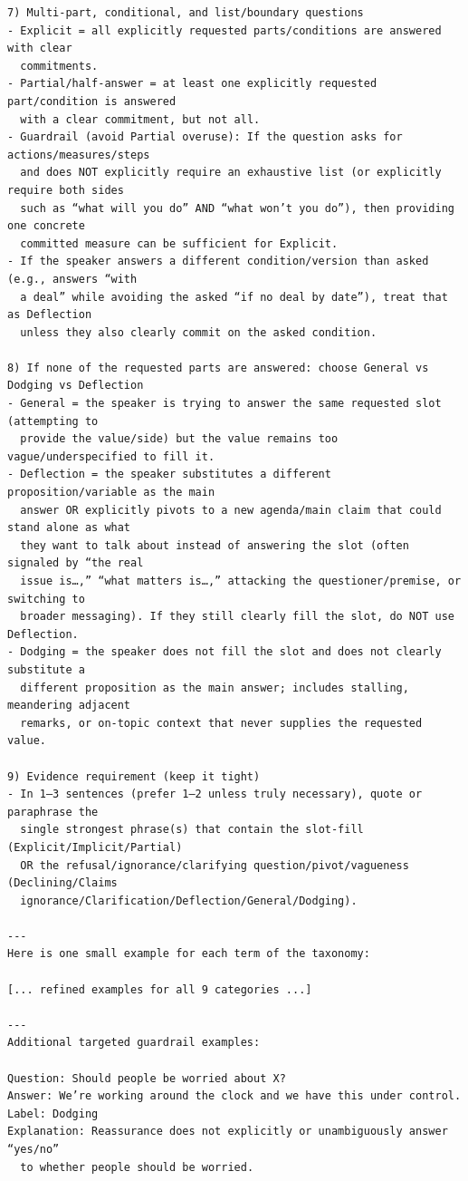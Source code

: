 \documentclass[11pt]{article}
\begin{document}
\begin{lstlisting}[style=yaml]
7) Multi-part, conditional, and list/boundary questions
- Explicit = all explicitly requested parts/conditions are answered with clear
  commitments.
- Partial/half-answer = at least one explicitly requested part/condition is answered
  with a clear commitment, but not all.
- Guardrail (avoid Partial overuse): If the question asks for actions/measures/steps
  and does NOT explicitly require an exhaustive list (or explicitly require both sides
  such as “what will you do” AND “what won’t you do”), then providing one concrete
  committed measure can be sufficient for Explicit.
- If the speaker answers a different condition/version than asked (e.g., answers “with
  a deal” while avoiding the asked “if no deal by date”), treat that as Deflection
  unless they also clearly commit on the asked condition.

8) If none of the requested parts are answered: choose General vs Dodging vs Deflection
- General = the speaker is trying to answer the same requested slot (attempting to
  provide the value/side) but the value remains too vague/underspecified to fill it.
- Deflection = the speaker substitutes a different proposition/variable as the main
  answer OR explicitly pivots to a new agenda/main claim that could stand alone as what
  they want to talk about instead of answering the slot (often signaled by “the real
  issue is…,” “what matters is…,” attacking the questioner/premise, or switching to
  broader messaging). If they still clearly fill the slot, do NOT use Deflection.
- Dodging = the speaker does not fill the slot and does not clearly substitute a
  different proposition as the main answer; includes stalling, meandering adjacent
  remarks, or on-topic context that never supplies the requested value.

9) Evidence requirement (keep it tight)
- In 1–3 sentences (prefer 1–2 unless truly necessary), quote or paraphrase the
  single strongest phrase(s) that contain the slot-fill (Explicit/Implicit/Partial)
  OR the refusal/ignorance/clarifying question/pivot/vagueness (Declining/Claims
  ignorance/Clarification/Deflection/General/Dodging).

---
Here is one small example for each term of the taxonomy:

[... refined examples for all 9 categories ...]

---
Additional targeted guardrail examples:

Question: Should people be worried about X?
Answer: We’re working around the clock and we have this under control.
Label: Dodging
Explanation: Reassurance does not explicitly or unambiguously answer “yes/no”
  to whether people should be worried.


\end{lstlisting}
\end{document}
